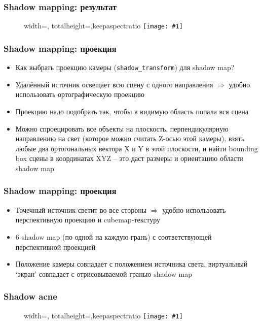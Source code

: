\documentclass{beamer}
\newcommand{\slideimage}[1]{
  \begin{figure}
    \begin{adjustbox}{width=\textwidth, totalheight=\textheight-2\baselineskip-2\baselineskip,keepaspectratio}
      \texttt{[image: \#1]}
    \end{adjustbox}
  \end{figure}
}
\begin{document}
\begin{frame}[fragile]
\frametitle{Shadow mapping: результат}
\slideimage{shadow-mapping2.png}
\end{frame}

\begin{frame}[fragile]
\frametitle{Shadow mapping: проекция}
\begin{itemize}
\item Как выбрать проекцию камеры (\verb|shadow_transform|) для shadow map?
\pause
\item Удалённый источник освещает всю сцену с одного направления \begin{math}\Longrightarrow\end{math} удобно использовать ортографическую проекцию
\pause
\item Проекцию надо подобрать так, чтобы в видимую область попала вся сцена
\pause
\item Можно спроецировать все объекты на плоскость, перпендикулярную направлению на свет (которое можно считать Z-осью этой камеры), взять любые два ортогональных вектора X и Y в этой плоскости, и найти bounding box сцены в координатах XYZ -- это даст размеры и ориентацию области shadow map
\end{itemize}
\end{frame}

\begin{frame}[fragile]
\frametitle{Shadow mapping: проекция}
\begin{itemize}
\item Точечный источник светит во все стороны \begin{math}\Longrightarrow\end{math} удобно использовать перспективную проекцию и cubemap-текстуру
\pause
\item 6 shadow map (по одной на каждую грань) с соответствующей перспективной проекцией
\pause
\item Положение камеры совпадает с положением источника света, виртуальный `экран' совпадает с отрисовываемой гранью shadow map
\end{itemize}
\end{frame}

\begin{frame}[fragile]
\frametitle{Shadow acne}
\slideimage{shadow-acne.png}
\end{frame}
\end{document}
